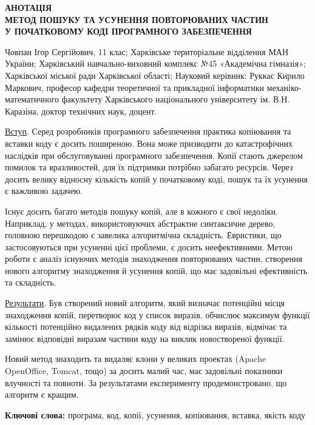 \documentclass[a4paper, 14pt]{article}
\begin{document}
\pagebreak
\noindent
\begin{center}
\textbf{
АНОТАЦІЯ \\
МЕТОД ПОШУКУ ТА УСУНЕННЯ ПОВТОРЮВАНИХ ЧАСТИН \\ 
У ПОЧАТКОВОМУ КОДІ ПРОГРАМНОГО ЗАБЕЗПЕЧЕННЯ
}
\end{center}
Човпан Ігор Сергійович, 11 клас; Харківське територіальне відділення МАН України; Харківський навчально-виховний комплекс №45 «Академічна гімназія»; Харківської міської ради Харківської області; Науковий керівник: Руккас Кирило Маркович, професор кафедри теоретичної та прикладної інформатики механіко­математичного факультету Харківського національного університету ім. В.Н. Каразіна, доктор технічних наук, доцент. \\
\par \uline{Вступ}. Серед розробників програмного забезпечення практика копіювання та вставки коду є досить поширеною. Вона може призводити до катастрофічних наслідків при обслуговуванні програмного забезпечення. Копії стають джерелом помилок та вразливостей, для їх підтримки потрібно забагато ресурсів.
Через досить велику відносну кількість копій у початковому коді, пошук та їх усунення є важливою задачею.
\par Існує досить багато методів пошуку копій, але в кожного є свої недоліки. Наприклад, у методах, використовуючих абстрактне синтаксичне дерево, головною перешкодою є завелика алгоритмічна складність. Евристики, що застосовуються при усуненні цієї проблеми, є досить неефективними.
Метою роботи є аналіз існуючих методів знаходження повторюваних частин, створення нового алгоритму знаходження й усунення копій, що має задовільні ефективність та складність.
\par \uline{Результати}. Був створений новий алгоритм, який визначає потенційні місця знаходження копій, перетворює код у список виразів, обчислює максимум функції кількості потенційно видалених рядків коду від відрізка виразів, відмічає та замінює відповідні виразам частини коду на виклик новоствореної функції.
\par Новий метод знаходить та видаляє клони у великих проектах (Apache OpenOffice, Tomcat, тощо) за досить малий час, має задовільні показники влучності та повноти.
За результатами експерименту продемонстровано, що алгоритм є кращим.
\par \textbf{Ключові слова:} програма, код, копії, усунення, копіювання, вставка, якість коду
\tableofcontents %
\end{document}
